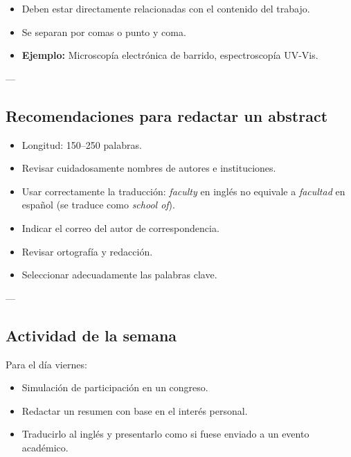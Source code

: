 \documentclass{article}
\begin{document}
\begin{itemize}
	\item Deben estar directamente relacionadas con el contenido del trabajo.  
	\item Se separan por comas o punto y coma.  
	\item \textbf{Ejemplo:} Microscopía electrónica de barrido, espectroscopía UV-Vis.
\end{itemize}

---

\subsection{Recomendaciones para redactar un abstract} \vspace{0.5cm}

\begin{itemize}
	\item Longitud: 150–250 palabras.  
	\item Revisar cuidadosamente nombres de autores e instituciones.  
	\item Usar correctamente la traducción: \textit{faculty} en inglés no equivale a \textit{facultad} en español (se traduce como \textit{school of}).  
	\item Indicar el correo del autor de correspondencia.  
	\item Revisar ortografía y redacción.  
	\item Seleccionar adecuadamente las palabras clave.  
\end{itemize}

---

\subsection{Actividad de la semana} \vspace{0.5cm}

Para el día viernes:  
\begin{itemize}
	\item Simulación de participación en un congreso.  
	\item Redactar un resumen con base en el interés personal.  
	\item Traducirlo al inglés y presentarlo como si fuese enviado a un evento académico.
\end{itemize}
\end{document}
